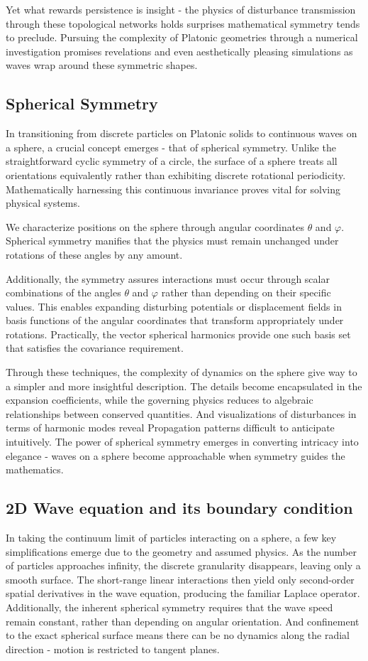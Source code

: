 \documentclass[final,5p,times,twocolumn,authoryear]{elsarticle}
\begin{document}
Yet what rewards persistence is insight - the physics of disturbance transmission through these topological networks holds surprises mathematical symmetry tends to preclude. Pursuing the complexity of Platonic geometries through a numerical investigation promises revelations and even aesthetically pleasing simulations as waves wrap around these symmetric shapes.


\subsection{Spherical Symmetry}
In transitioning from discrete particles on Platonic solids to continuous waves on a sphere, a crucial concept emerges - that of spherical symmetry. Unlike the straightforward cyclic symmetry of a circle, the surface of a sphere treats all orientations equivalently rather than exhibiting discrete rotational periodicity. Mathematically harnessing this continuous invariance proves vital for solving physical systems.

We characterize positions on the sphere through angular coordinates $\theta$ and $\varphi$. Spherical symmetry manifies that the physics must remain unchanged under rotations of these angles by any amount. 

Additionally, the symmetry assures interactions must occur through scalar combinations of the angles $\theta$ and $\varphi$ rather than depending on their specific values. This enables expanding disturbing potentials or displacement fields in basis functions of the angular coordinates that transform appropriately under rotations. Practically, the vector spherical harmonics provide one such basis set that satisfies the covariance requirement.

Through these techniques, the complexity of dynamics on the sphere give way to a simpler and more insightful description. The details become encapsulated in the expansion coefficients, while the governing physics reduces to algebraic relationships between conserved quantities. And visualizations of disturbances in terms of harmonic modes reveal Propagation patterns difficult to anticipate intuitively. The power of spherical symmetry emerges in converting intricacy into elegance - waves on a sphere become approachable when symmetry guides the mathematics.

\subsection{2D Wave equation and its boundary condition}
In taking the continuum limit of particles interacting on a sphere, a few key simplifications emerge due to the geometry and assumed physics. As the number of particles approaches infinity, the discrete granularity disappears, leaving only a smooth surface. The short-range linear interactions then yield only second-order spatial derivatives in the wave equation, producing the familiar Laplace operator. Additionally, the inherent spherical symmetry requires that the wave speed remain constant, rather than depending on angular orientation. And confinement to the exact spherical surface means there can be no dynamics along the radial direction - motion is restricted to tangent planes.
\end{document}
